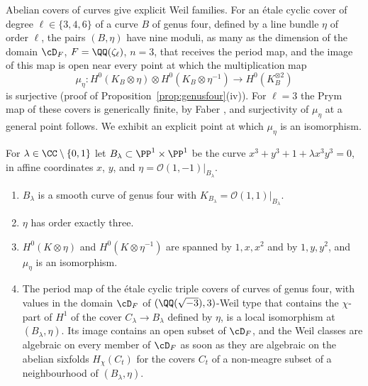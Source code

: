 Abelian covers of curves give explicit Weil families. For an \'etale cyclic cover of degree $\ell\in\{3,4,6\}$ of a curve $B$ of genus four, defined by a line bundle $\eta$ of order $\ell$, the pairs $(B,\eta)$ have nine moduli, as many as the dimension of the domain $\cD_{F}$, $F=\QQ(\zeta_{\ell})$, $n=3$, that receives the period map, and the image of this map is open near every point at which the multiplication map
\begin{equation}\label{eq:multmap}
\mu_{\eta}\colon H^{0}(K_{B}\otimes\eta)\otimes H^{0}(K_{B}\otimes\eta^{-1})\longrightarrow H^{0}(K_{B}^{\otimes2})
\end{equation}
is surjective (proof of Proposition~\ref{prop:genusfour}(iv)). For $\ell=3$ the Prym map of these covers is generically finite, by Faber \cite{Fab88}, and surjectivity of $\mu_{\eta}$ at a general point follows. We exhibit an explicit point at which $\mu_{\eta}$ is an isomorphism.

\begin{proposition}\label{prop:genusfour}
For $\lambda\in\CC\setminus\{0,1\}$ let $B_{\lambda}\subset\PP^{1}\times\PP^{1}$ be the curve $x^{3}+y^{3}+1+\lambda x^{3}y^{3}=0$, in affine coordinates $x$, $y$, and $\eta=\mathcal{O}(1,-1)|_{B_{\lambda}}$.
\begin{enumerate}[label=\textup{(\roman*)},leftmargin=2.4em,itemsep=2pt]
\item $B_{\lambda}$ is a smooth curve of genus four with $K_{B_{\lambda}}=\mathcal{O}(1,1)|_{B_{\lambda}}$.
\item $\eta$ has order exactly three.
\item $H^{0}(K\otimes\eta)$ and $H^{0}(K\otimes\eta^{-1})$ are spanned by $1,x,x^{2}$ and by $1,y,y^{2}$, and $\mu_{\eta}$ is an isomorphism.
\item The period map of the \'etale cyclic triple covers of curves of genus four, with values in the domain $\cD_{F}$ of $(\QQ(\sqrt{-3}),3)$-Weil type that contains the $\chi$-part of $H^{1}$ of the cover $C_{\lambda}\to B_{\lambda}$ defined by $\eta$, is a local isomorphism at $(B_{\lambda},\eta)$. Its image contains an open subset of $\cD_{F}$, and the Weil classes are algebraic on every member of $\cD_{F}$ as soon as they are algebraic on the abelian sixfolds $H_{\chi}(C_{t})$ for the covers $C_{t}$ of a non-meagre subset of a neighbourhood of $(B_{\lambda},\eta)$.
\end{enumerate}
\end{proposition}

